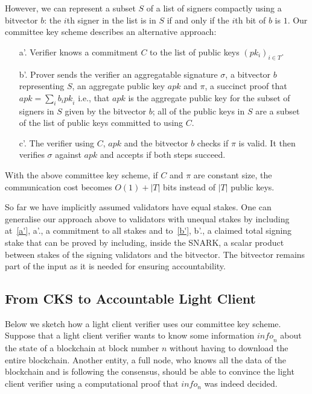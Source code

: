 \noindent However, we can represent a subset $S$ of a list of signers compactly using a bitvector $b$: 
the $i$th signer in the list is in $S$ if and only if the $i$th bit of $b$ is $1$. Our committee key scheme describes an alternative approach:

\begin{itemize}
\item[a'.]\label{a'} Verifier knows a commitment $C$ to the list of public keys $(pk_i)_{i \in T}$.

\item[b'.]\label{b'} Prover sends the verifier an aggregatable signature $\sigma$, a bitvector $b$ representing $S$, an aggregate public key 
$\mathit{apk}$ and $\pi$, a succinct proof that $\mathit{apk}=\sum_i b_i \mathit{pk}_i$ i.e., 
that $\mathit{apk}$ is the aggregate public key for the subset of signers in $S$ given by the bitvector $b$; all of the public keys in $S$ are a subset 
of the list of public keys committed to using $C$.

\item[c'.] The verifier using $C$, $\mathit{apk}$ and the bitvector $b$ checks if $\pi$ is valid. 
It then verifies $\sigma$ against $\mathit{apk}$ and accepts if both steps succeed.
\end{itemize}

\noindent With the above committee key scheme, if $C$ and $\pi$ are constant size, 
the communication cost becomes $O(1)+|T|$ bits instead of $|T|$ public keys.  

So far we have implicitly assumed validators have equal stakes. 
One can generalise our approach  above to validators with unequal stakes by including at~\ref{a'}, a'.,  a commitment to all stakes 
and to~\ref{b'}, b'., a claimed total signing stake that can be proved by including, inside the SNARK, a scalar product between stakes of the signing validators and the bitvector. 
The bitvector remains part of the input as it is needed for ensuring accountability.

\subsection{From CKS to Accountable Light Client}
\label{sec_intro_committee}

Below we sketch how a light client verifier uses our committee key scheme. Suppose that a light client verifier wants to know some information $\mathit{info}_n$ about the state of a blockchain at block number $n$ without having to download the entire blockchain. Another entity, a full node, who knows all the data of the blockchain and is following the consensus, should be able to convince the light client verifier using a computational proof that $info_n$ was indeed decided.

